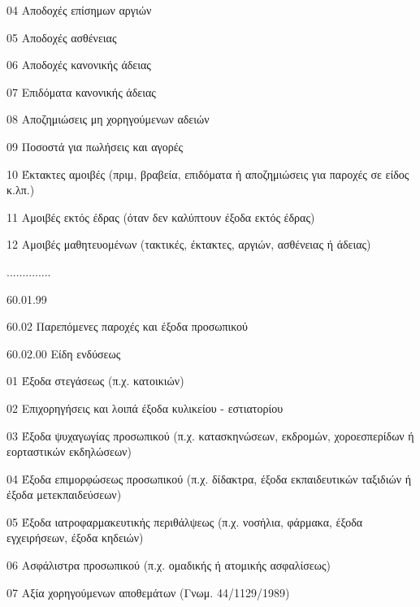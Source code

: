 \documentclass[A4,10pt,greek]{book}
\begin{document}
                               04   Αποδοχές επίσημων αργιών

                               05   Αποδοχές ασθένειας

                               06   Αποδοχές κανονικής άδειας

                               07   Επιδόματα κανονικής άδειας

                               08   Αποζημιώσεις μη χορηγούμενων αδειών

                               09   Ποσοστά για πωλήσεις και αγορές

                               10   Έκτακτες αμοιβές (πριμ, βραβεία, επιδόματα ή αποζημιώσεις
                                       για παροχές σε είδος κ.λπ.)

                               11   Αμοιβές εκτός έδρας (όταν δεν καλύπτουν έξοδα εκτός έδρας)

                               12   Αμοιβές μαθητευομένων (τακτικές, έκτακτες, αργιών,
                                       ασθένειας ή άδειας)

                    ..............

                    60.01.99

        60.02   Παρεπόμενες παροχές και έξοδα προσωπικού

                    60.02.00   Είδη ενδύσεως

                               01   Έξοδα στεγάσεως (π.χ. κατοικιών)

                               02   Επιχορηγήσεις και λοιπά έξοδα κυλικείου - εστιατορίου

                               03   Έξοδα ψυχαγωγίας προσωπικού (π.χ. κατασκηνώσεων,
                                       εκδρομών, χοροεσπερίδων ή εορταστικών εκδηλώσεων)

                               04   Έξοδα επιμορφώσεως προσωπικού (π.χ. δίδακτρα, έξοδα
                                       εκπαιδευτικών ταξιδιών ή έξοδα μετεκπαιδεύσεων)

                               05   Έξοδα ιατροφαρμακευτικής περιθάλψεως (π.χ. νοσήλια,
                                       φάρμακα, έξοδα εγχειρήσεων, έξοδα κηδειών)

                               06   Ασφάλιστρα προσωπικού (π.χ. ομαδικής ή ατομικής
                                       ασφαλίσεως)

                               07   Αξία χορηγούμενων αποθεμάτων (Γνωμ. 44/1129/1989)
\end{document}
